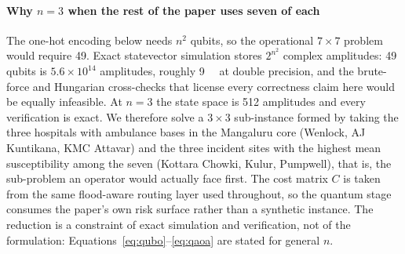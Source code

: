 \documentclass[10pt,twocolumn]{article}
\begin{document}
\paragraph{Why $n=3$ when the rest of the paper uses seven of each}
The one-hot encoding below needs $n^2$ qubits, so the operational $7\times7$
problem would require 49. Exact statevector simulation stores $2^{n^2}$ complex
amplitudes: 49 qubits is $5.6\times10^{14}$ amplitudes, roughly \SI{9}{\peta\byte}
at double precision, and the brute-force and Hungarian cross-checks that license
every correctness claim here would be equally infeasible. At $n=3$ the state
space is 512 amplitudes and every verification is exact. We therefore solve a
$3\times3$ sub-instance formed by taking the three hospitals with ambulance
bases in the Mangaluru core (Wenlock, AJ Kuntikana, KMC Attavar) and the three
incident sites with the highest mean susceptibility among the seven (Kottara
Chowki, Kulur, Pumpwell), that is, the sub-problem an operator would actually
face first. The cost matrix $C$ is taken from the same flood-aware routing layer
used throughout, so the quantum stage consumes the paper's own risk surface
rather than a synthetic instance. The reduction is a constraint of exact
simulation and verification, not of the formulation:
Equations~\eqref{eq:qubo}--\eqref{eq:qaoa} are stated for general $n$.
\end{document}

